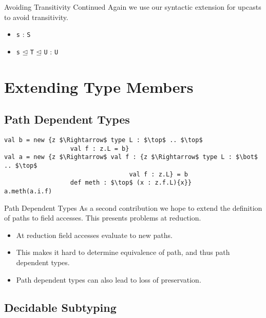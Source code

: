 \documentclass[dvipsnames]{beamer}
\begin{document}
\begin{frame}{Avoiding Transitivity Continued}
Again we use our syntactic extension for upcasts to avoid transitivity.
\begin{itemize}
\item
\texttt{s} : \texttt{S}
\item
\texttt{s} $\unlhd$ \texttt{T} $\unlhd$ \texttt{U} : \texttt{U}
\end{itemize}
\end{frame}

\section{Extending Type Members}

\subsection{Path Dependent Types}


\begin{lrbox}{\tmExPaths}
\begin{lstlisting}[mathescape, style=customlang]
val b = new {z $\Rightarrow$ type L : $\top$ .. $\top$
                  val f : z.L = b}
val a = new {z $\Rightarrow$ val f : {z $\Rightarrow$ type L : $\bot$ .. $\top$
                                  val f : z.L} = b
                  def meth : $\top$ (x : z.f.L){x}}
a.meth(a.i.f)
\end{lstlisting}
\end{lrbox}

\begin{frame}{Path Dependent Types}
As a second contribution we hope to extend the definition of paths to field accesses. This presents problems at reduction.
\begin{itemize}
\item
At reduction field accesses evaluate to new paths.
\item
This makes it hard to determine equivalence of path, and thus path dependent types.
\item
Path dependent types can also lead to loss of preservation.
\end{itemize}
\end{frame}

\subsection{Decidable Subtyping}
\end{document}
